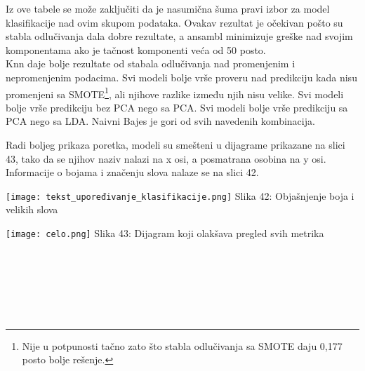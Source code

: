 \documentclass[a4paper]{article}
\begin{document}
{Iz ove tabele se može zaključiti da je nasumična šuma pravi izbor za model klasifikacije nad ovim skupom podataka. Ovakav rezultat je očekivan pošto su stabla odlučivanja dala dobre rezultate, a ansambl minimizuje greške nad svojim komponentama ako je tačnost komponenti veća od 50 posto.\\

Knn daje bolje rezultate od stabala odlučivanja nad promenjenim i nepromenjenim podacima. Svi modeli bolje vrše proveru nad predikciju kada nisu promenjeni sa SMOTE\footnote[6]{Nije u potpunosti tačno zato što stabla odlučivanja sa SMOTE daju 0,177 posto bolje rešenje.}, ali njihove razlike između njih nisu velike. Svi modeli bolje vrše predikciju bez PCA nego sa PCA. Svi modeli bolje vrše predikciju sa PCA nego sa LDA. Naivni Bajes je gori od svih navedenih kombinacija.\\

\noindent\begin{minipage}{0.45\textwidth}
Radi boljeg prikaza poretka, modeli su smešteni u dijagrame prikazane na slici 43, tako da se njihov naziv nalazi na x osi, a posmatrana osobina na y osi. Informacije o bojama i značenju slova nalaze se na slici 42.\\
\end{minipage}
\noindent\begin{minipage}{0.1\textwidth}
\hphantom{a}
\end{minipage}
\noindent\begin{minipage}{0.45\textwidth}
\texttt{[image: tekst\_upoređivanje\_klasifikacije.png]}
Slika 42: Objašnjenje boja i velikih slova\\
\end{minipage}

\noindent\begin{minipage}{1.1\textwidth}
\texttt{[image: celo.png]}
\hphantom{aaaaaaaaaaaaaaaaaaaa}Slika 43: Dijagram koji olakšava pregled svih metrika\\
\end{minipage}

\phantom{a\\}\\
\phantom{a\\}\\
\phantom{a\\}\\
\phantom{a\\}\\
\phantom{a\\}\\

}
\end{document}
